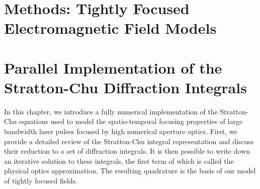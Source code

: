 \documentclass[11pt,SymmetricalJury]{inrsthesis/inrsthesis}
\newenvironment{chaptersummary}{%
  \begin{quotation}
  \SingleSpacing
  \setlength{\parskip}{\baselineskip}}{%
  \end{quotation}}
\begin{document}

\chapter{Methods: Tightly Focused Electromagnetic Field Models}
\label{chapter:methods}

\chapter{Parallel Implementation of the Stratton-Chu Diffraction Integrals}
\label{chapter:stratton-chu}


In this chapter, we introduce a fully numerical implementation of the Stratton-Chu
equations used to model the spatio-temporal focusing properties of large
bandwidth laser pulses focused by high numerical aperture optics. First, we
provide a detailed review of the Stratton-Chu integral representation and discuss
their reduction to a set of diffraction integrals. 
It is then possible to write down an iterative solution to these integrals, the
first term of which is called the physical optics approximation. The resulting
quadrature is the basis of our model of tightly focused fields.
\end{document}
